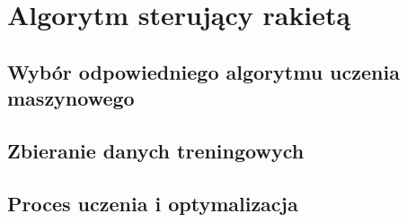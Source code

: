 \chapter{Algorytm sterujący rakietą}
\section{Wybór odpowiedniego algorytmu uczenia maszynowego}
\section{Zbieranie danych treningowych}
\section{Proces uczenia i optymalizacja}